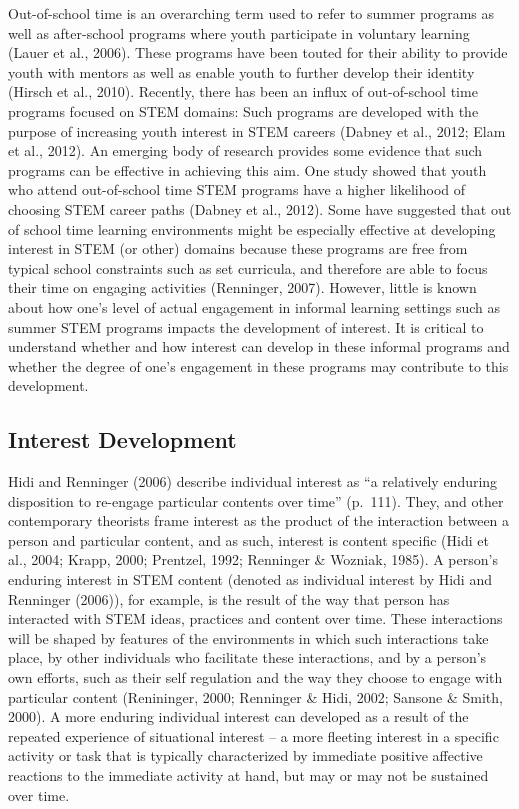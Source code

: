\documentclass[man]{apa6}
\theoremstyle{definition}
\theoremstyle{definition}
\theoremstyle{definition}
\theoremstyle{remark}
\begin{document}
Out-of-school time is an overarching term used to refer to summer
programs as well as after-school programs where youth participate in
voluntary learning (Lauer et al., 2006). These programs have been touted
for their ability to provide youth with mentors as well as enable youth
to further develop their identity (Hirsch et al., 2010). Recently, there
has been an influx of out-of-school time programs focused on STEM
domains: Such programs are developed with the purpose of increasing
youth interest in STEM careers (Dabney et al., 2012; Elam et al., 2012).
An emerging body of research provides some evidence that such programs
can be effective in achieving this aim. One study showed that youth who
attend out-of-school time STEM programs have a higher likelihood of
choosing STEM career paths (Dabney et al., 2012). Some have suggested
that out of school time learning environments might be especially
effective at developing interest in STEM (or other) domains because
these programs are free from typical school constraints such as set
curricula, and therefore are able to focus their time on engaging
activities (Renninger, 2007). However, little is known about how one's
level of actual engagement in informal learning settings such as summer
STEM programs impacts the development of interest. It is critical to
understand whether and how interest can develop in these informal
programs and whether the degree of one's engagement in these programs
may contribute to this development.

\subsection{Interest Development}\label{interest-development}

Hidi and Renninger (2006) describe individual interest as \enquote{a
relatively enduring disposition to re-engage particular contents over
time} (p.~111). They, and other contemporary theorists frame interest as
the product of the interaction between a person and particular content,
and as such, interest is content specific (Hidi et al., 2004; Krapp,
2000; Prentzel, 1992; Renninger \& Wozniak, 1985). A person's enduring
interest in STEM content (denoted as individual interest by Hidi and
Renninger (2006)), for example, is the result of the way that person has
interacted with STEM ideas, practices and content over time. These
interactions will be shaped by features of the environments in which
such interactions take place, by other individuals who facilitate these
interactions, and by a person's own efforts, such as their self
regulation and the way they choose to engage with particular content
(Renininger, 2000; Renninger \& Hidi, 2002; Sansone \& Smith, 2000). A
more enduring individual interest can developed as a result of the
repeated experience of situational interest -- a more fleeting interest
in a specific activity or task that is typically characterized by
immediate positive affective reactions to the immediate activity at
hand, but may or may not be sustained over time.
\end{document}
